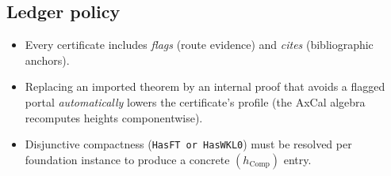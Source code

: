 \documentclass[11pt]{article}
\theoremstyle{definition}
\theoremstyle{remark}
\newcommand{\hComp}{h_{\mathrm{Comp}}}        %
\begin{document}
\subsection{Ledger policy}
\begin{itemize}
\item Every certificate includes \emph{flags} (route evidence) and \emph{cites} (bibliographic anchors).
\item Replacing an imported theorem by an internal proof that avoids a flagged portal \emph{automatically} lowers the certificate's profile (the AxCal algebra recomputes heights componentwise).
\item Disjunctive compactness (\verb|HasFT or HasWKL0|) must be resolved per foundation instance to produce a concrete $(\hComp)$ entry.
\end{itemize}
\end{document}
